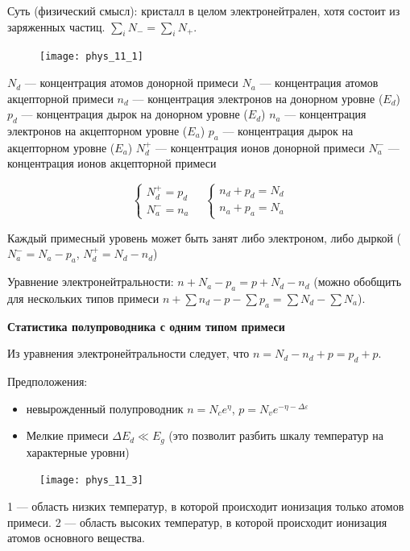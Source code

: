 Суть (физический смысл): кристалл в целом электронейтрален, хотя состоит из заряженных частиц. $\sum \limits_i N_{-} = \sum \limits_i N_{+}$.

\begin{figure}[h!]
    \centering
    \texttt{[image: phys\_11\_1]}
\end{figure}

$N_d$ --- концентрация атомов донорной примеси
$N_a$ --- концентрация атомов акцепторной примеси
$n_d$ --- концентрация электронов на донорном уровне ($E_d$)
$p_d$ --- концентрация дырок на донорном уровне ($E_d$)
$n_a$ --- концентрация электронов на акцепторном уровне ($E_a$)
$p_a$ --- концентрация дырок на акцепторном уровне ($E_a$)
$N_d^+$ --- концентрация ионов донорной примеси
$N_a^-$ --- концентрация ионов акцепторной примеси

$$
\left\{\begin{array} { l } 
{ N _ { d } ^ { + } = p _ { d } } \\
{ N _ { a } ^ { - } = n _ { a } }
\end{array} \quad \left\{\begin{array}{l}
n_d+p_d=N_d \\
n_a+p_a=N_a
\end{array}\right.\right.
$$

Каждый примесный уровень может быть занят либо электроном, либо дыркой ($N_a^-=N_a-p_a$, $N_d^+=N_d-n_d$)

Уравнение электронейтральности: $n+N_a-p_a=p+N_d-n_d$ (можно обобщить для нескольких типов примеси $n+\sum n_d-p-\sum p_a=\sum N_d-\sum N_a$).

\textbf{Статистика полупроводника с одним типом примеси}

Из уравнения электронейтральности следует, что $n=N_d-n_d+p=p_d+p$.

Предположения:

\begin{itemize}
    \item невырожденный полупроводник $n=N_ce^\eta$, $p=N_ve^{-\eta-\Delta\varepsilon}$
    \item Мелкие примеси $\Delta E_d \ll E_g$ (это позволит разбить шкалу температур на характерные уровни)
\end{itemize}

\begin{figure}[h!]
    \centering
    \texttt{[image: phys\_11\_3]}
\end{figure}

1 --- область низких температур, в которой происходит ионизация только атомов примеси.
2 --- область высоких температур, в которой происходит ионизация атомов основного вещества.

